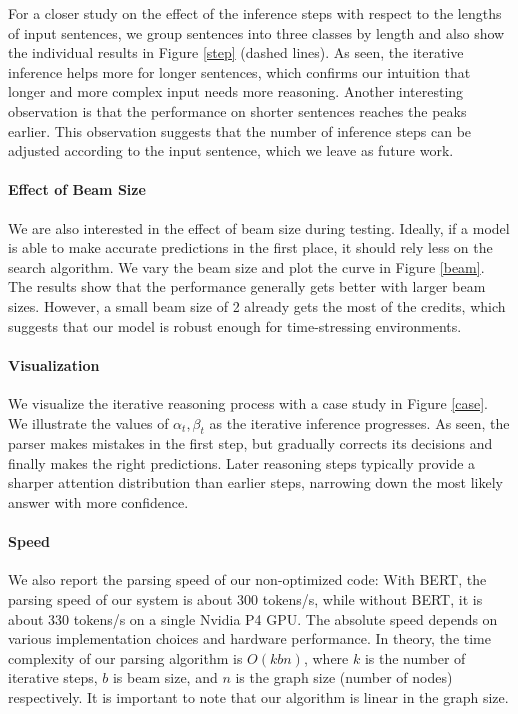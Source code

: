\documentclass[11pt,a4paper]{article}
\begin{document}
	For a closer study on the effect of the inference steps with respect to the lengths of input sentences, we group sentences into three classes by length and also show the individual results in Figure \ref{step} (dashed lines). As seen, the iterative inference helps more for longer sentences, which confirms our intuition that longer and more complex input needs more reasoning. Another interesting observation is that the performance on shorter sentences reaches the peaks earlier. This observation suggests that the number of inference steps can be adjusted according to the input sentence, which we leave as future work.
	\paragraph{Effect of Beam Size}
	We are also interested in the effect of beam size during testing. Ideally, if a model is able to make accurate predictions in the first place, it should rely less on the search algorithm. We vary the beam size and plot the curve in Figure \ref{beam}. The results show that the performance generally gets better with larger beam sizes. However, a small beam size of 2 already gets the most of the credits, which suggests that our model is robust enough for time-stressing environments.
	\paragraph{Visualization}
	We visualize the iterative reasoning process with a case study in Figure \ref{case}. We illustrate the values of $\alpha_t, \beta_t$ as the iterative inference progresses. As seen, the parser makes mistakes in the first step, but gradually corrects its decisions and finally makes the right predictions. Later reasoning steps typically provide a sharper attention distribution than earlier steps, narrowing down the most likely answer with more confidence.
	\paragraph{Speed}
	We also report the parsing speed of our non-optimized code: With BERT, the parsing speed of our system is about 300 tokens/s, while without BERT, it is about 330 tokens/s on a single Nvidia P4 GPU. The absolute speed depends on various implementation choices and hardware performance. In theory, the time complexity of our parsing algorithm is $O(kbn)$, where $k$ is the number of iterative steps, $b$ is beam size, and $n$ is the graph size (number of nodes) respectively. It is important to note that our algorithm is linear in the graph size.
\end{document}
